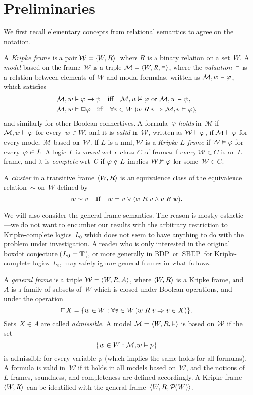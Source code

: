 \documentclass[leqno,draft,11pt]{article}
\def\wbc{BDP}
\def\sbc{SBDP}
\let\frm\mathcal
\begin{document}
\section{Preliminaries}\label{sec:preliminaries}
We first recall elementary concepts from relational semantics to agree on the
notation.
\begin{Def}\th\label{def:kripke}
A \emph{Kripke frame} is a pair $\frm W=\p{W,R}$, where $R$ is a binary
relation on a set~$W$. A \emph{model} based on the frame~$\frm W$ is a
triple $\frm M=\p{W,R,{\model}}$, where the \emph{valuation~$\vDash$} is
a relation between elements of~$W$ and modal formulas, written as
$\frm M,w\model\fii$, which satisfies
\begin{align*}
\frm M,w&\model\fii\to\psi\iff
    \frm M,w\nmodel\fii\text{ or }\frm M,w\model\psi,\\
\frm M,w&\model\Box\fii\iff
    \forall v\in W\,(w\mr Rv\TO\frm M,v\model\fii),
\end{align*}
and similarly for other Boolean connectives.
A formula~$\varphi$ \emph{holds} in~$\frm M$ if $\frm M,w\model\fii$ for every~$w\in W$,
and it is \emph{valid} in~$\frm W$, written as $\frm W\model\fii$, if
$\frm M\model\fii$ for every model~$\frm M$ based on~$\frm W$. If $L$
is a nml, $\frm W$ is a \emph{Kripke $L$-frame}
if $\frm W\model\fii$ for every~$\varphi\in L$. A logic $L$ is
\emph{sound} wrt a class~$C$ of frames if every $\frm W\in C$ is an
$L$-frame, and it is \emph{complete} wrt~$C$ if $\varphi\notin L$ implies
$\frm W\nmodel\fii$ for some~$\frm W\in C$.

A \emph{cluster} in a transitive frame~$\langle W,R\rangle$ is an equivalence
class of the equivalence relation~$\sim$ on~$W$ defined by
\[w\sim v\quad\text{iff}\quad w=v\lor(w\mathrel Rv\land v\mathrel Rw).\]
\end{Def}

We will also consider the general frame semantics. The reason is
mostly esthetic---we do not want to encumber our results with the
arbitrary restriction to Kripke-complete logics~$L_0$ which does not seem to
have anything to do with the problem under investigation. A reader who
is only interested in the original boxdot conjecture ($L_0=\mathbf T$),
or more generally in \wbc\ or~\sbc\ for Kripke-complete logics~$L_0$, may
safely ignore general frames in what follows.
\begin{Def}\th\label{def:genfr}
A \emph{general frame} is a triple $\frm W=\p{W,R,A}$, where $\langle W,R\rangle$
is a Kripke frame, and $A$ is a family of subsets of~$W$ which is
closed under Boolean operations, and under the operation
\[\Box X=\{w\in W:\forall v\in W\,(w\mathrel Rv\Rightarrow v\in X)\}.\]
Sets~$X\in A$ are called \emph{admissible}. A model $\frm
M=\p{W,R,{\model}}$ is based on~$\frm W$ if the set
\[\{w\in W:\frm M,w\model p\}\]
is admissible for every variable~$p$ (which implies the same holds for all
formulas). A formula is valid in~$\frm W$ if it holds in all models
based on~$\frm W$, and the notions of $L$-frames, soundness, and
completeness are defined accordingly. A Kripke frame~$\langle W,R\rangle$ can be
identified with the general frame~$\langle W,R,\mathcal P(W)\rangle$.
\end{Def}
\end{document}
